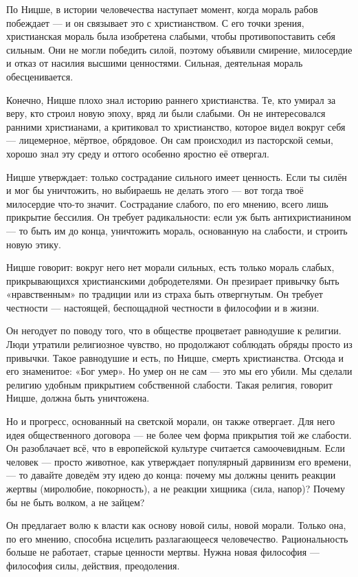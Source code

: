 По Ницше, в истории человечества наступает момент, когда мораль рабов побеждает --- и он связывает это с христианством. С его точки зрения, христианская мораль была изобретена слабыми, чтобы противопоставить себя сильным. Они не могли победить силой, поэтому объявили смирение, милосердие и отказ от насилия высшими ценностями. Сильная, деятельная мораль обесценивается.

Конечно, Ницше плохо знал историю раннего христианства. Те, кто умирал за веру, кто строил новую эпоху, вряд ли были слабыми. Он не интересовался ранними христианами, а критиковал то христианство, которое видел вокруг себя --- лицемерное, мёртвое, обрядовое. Он сам происходил из пасторской семьи, хорошо знал эту среду и оттого особенно яростно её отвергал.

Ницше утверждает: только сострадание сильного имеет ценность. Если ты силён и мог бы уничтожить, но выбираешь не делать этого --- вот тогда твоё милосердие что-то значит. Сострадание слабого, по его мнению, всего лишь прикрытие бессилия. Он требует радикальности: если уж быть антихристианином --- то быть им до конца, уничтожить мораль, основанную на слабости, и строить новую этику.

Ницше говорит: вокруг него нет морали сильных, есть только мораль слабых, прикрывающихся христианскими добродетелями. Он презирает привычку быть «нравственным» по традиции или из страха быть отвергнутым. Он требует честности --- настоящей, беспощадной честности в философии и в жизни.

Он негодует по поводу того, что в обществе процветает равнодушие к религии. Люди утратили религиозное чувство, но продолжают соблюдать обряды просто из привычки. Такое равнодушие и есть, по Ницше, смерть христианства. Отсюда и его знаменитое: «Бог умер». Но умер он не сам --- это мы его убили. Мы сделали религию удобным прикрытием собственной слабости. Такая религия, говорит Ницше, должна быть уничтожена.

Но и прогресс, основанный на светской морали, он также отвергает. Для него идея общественного договора --- не более чем форма прикрытия той же слабости. Он разоблачает всё, что в европейской культуре считается самоочевидным. Если человек --- просто животное, как утверждает популярный дарвинизм его времени, --- то давайте доведём эту идею до конца: почему мы должны ценить реакции жертвы (миролюбие, покорность), а не реакции хищника (сила, напор)? Почему бы не быть волком, а не зайцем?

Он предлагает волю к власти как основу новой силы, новой морали. Только она, по его мнению, способна исцелить разлагающееся человечество. Рациональность больше не работает, старые ценности мертвы. Нужна новая философия --- философия силы, действия, преодоления.

